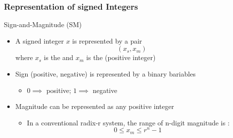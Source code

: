 \subsubsection{Representation of signed Integers}
\begin{parag}{Sign-and-Magnitude (SM)}
    \begin{itemize}
        \item A signed integer $x$ is represented by a pair
        \[(x_s, x_m)\]
        where $x_s$ is the  and $x_m$ is the  (positive integer)
        \item Sign (positive, negative) is represented by a binary bariables 
        \begin{itemize}
            \item $0 \implies$ positive; $1 \implies $ negative
        \end{itemize}
        \item Magnitude can be represented as any positive integer
        \begin{itemize}
            \item In a conventional radix-r system, the range of n-digit magnitude is :
            \[0 \leq x_m \leq r^n - 1\]
        \end{itemize}
    \end{itemize}
\end{parag}